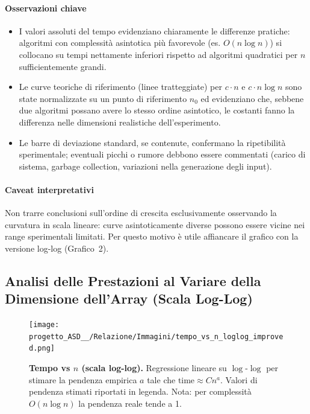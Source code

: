 \documentclass[a4paper, 11pt]{article}
\begin{document}
\paragraph{Osservazioni chiave}
\begin{itemize}
  \item I valori assoluti del tempo evidenziano chiaramente le differenze pratiche: algoritmi con complessità asintotica più favorevole (es. \(O(n\log n)\)) si collocano su tempi nettamente inferiori rispetto ad algoritmi quadratici per \(n\) sufficientemente grandi.
  \item Le curve teoriche di riferimento (linee tratteggiate) per \(c\cdot n\) e \(c\cdot n\log n\) sono state normalizzate su un punto di riferimento \(n_0\) ed evidenziano che, sebbene due algoritmi possano avere lo stesso ordine asintotico, le costanti fanno la differenza nelle dimensioni realistiche dell'esperimento.
  \item Le barre di deviazione standard, se contenute, confermano la ripetibilità sperimentale; eventuali picchi o rumore debbono essere commentati (carico di sistema, garbage collection, variazioni nella generazione degli input).
\end{itemize}

\paragraph{Caveat interpretativi}
Non trarre conclusioni sull'ordine di crescita esclusivamente osservando la curvatura in scala lineare: curve asintoticamente diverse possono essere vicine nei range sperimentali limitati. Per questo motivo è utile affiancare il grafico con la versione log-log (Grafico~2).

\subsection{Analisi delle Prestazioni al Variare della Dimensione dell'Array (Scala Log-Log)}
\begin{figure}[H]
\centering
\texttt{[image: progetto\_ASD\_\_/Relazione/Immagini/tempo\_vs\_n\_loglog\_improved.png]}
\caption{\textbf{Tempo vs \(n\) (scala log-log).} Regressione lineare su \(\log\)-\(\log\) per stimare la pendenza empirica \(a\) tale che \(\text{time}\approx C n^{a}\). Valori di pendenza stimati riportati in legenda. Nota: per complessità \(O(n\log n)\) la pendenza reale tende a 1.}
\label{fig:variazione_m}
\end{figure}
\end{document}
